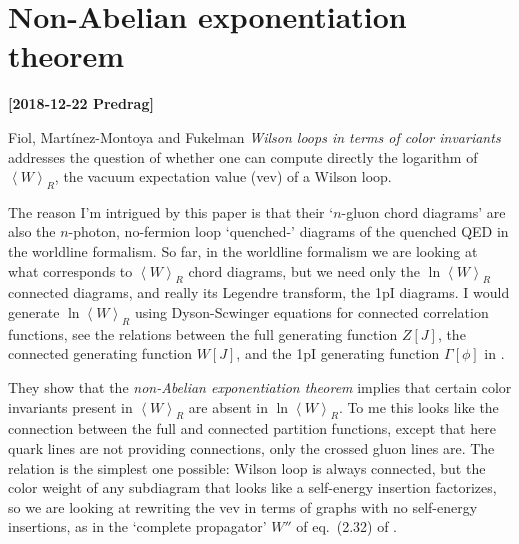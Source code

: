 

\section{Non-Abelian exponentiation theorem}
\label{s:FiMaFu18}
\newcommand{\vev}[1]{{\left< {#1} \right>}}

{\bf [2018-12-22 Predrag]}

Fiol, Martínez-Montoya and Fukelman {\em Wilson loops in
terms of color invariants} addresses the question of whether one can
compute directly the logarithm of $\vev{W}_R$, the vacuum expectation
value (vev) of a Wilson loop.

The reason I'm intrigued by this paper is that their `$n$-gluon chord
diagrams' are also the $n$-photon, no-fermion loop `quenched-'
diagrams
of the quenched QED in the worldline formalism. So far, in the worldline
formalism we are looking at what corresponds to $\vev{W}_R$ chord
diagrams, but we need only the $\ln \vev{W}_R$ connected diagrams, and really
its Legendre transform, the 1pI diagrams. I would generate $\ln
\vev{W}_R$ using Dyson-Scwinger equations for connected correlation
functions, see the relations between the full generating function $Z[J]$,
the connected generating function $W[J]$, and the 1pI generating function
$\Gamma[\phi]$ in .

They show that the \emph{non-Abelian exponentiation
theorem} implies that certain color invariants
present in $\vev{W}_R$ are absent in $\ln \vev{W}_R$. To me this looks
like the connection between the full and connected partition functions,
except that here quark lines are not providing connections, only the
crossed gluon lines are. The relation is the simplest one possible:
Wilson loop is always connected, but the color weight of any subdiagram
that looks like a self-energy insertion factorizes, so we are looking at
rewriting the vev in terms of graphs with no self-energy insertions, as
in the `complete propagator' $W''$ of eq.~(2.32) of .

